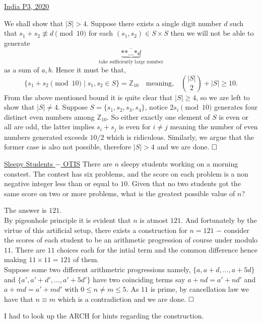 \begin{problem}{1}{\href{https://artofproblemsolving.com/community/c6h1989008p34732913}{India P3, 2020}}
\begin{solution}
	 We shall show that $|S|>4$. Suppose there exists a single digit number $d$ such that $s_1+s_2\not\equiv d\pmod{10}$ for each $(s_1, s_2)\in S\times S$ then we will not be able to generate
$$\underbrace{\overline{\text{**}\ldots\text{*}d}}_{\text{take sufficiently large number}}$$as a sum of $a,b$. Hence it must be that,
$$\{s_1+s_2\pmod{10} \mid s_1,s_2\in S\}=\mathbb{Z}_{10}\quad\text{meaning,}\quad \binom{|S|}{2}+|S|\ge 10.$$From the above mentioned bound it is quite clear that $|S|\ge 4$, so we are left to show that $|S|\ne 4$. Suppose $S=\{s_1,s_2,s_3,s_4\}$, notice $2s_i\pmod {10}$ generates four distinct even numbers among $\mathbb{Z}_{10}$. So either exactly one element of $S$ is even or all are odd, the latter implies $s_i+s_j$ is even for $i\ne j$ meaning the number of even numbers generated exceeds $10/2$ which is ridiculous. Similarly, we argue that the former case is also not possible, therefore $|S|>4$ and we are done. $\qedwhite$

	\end{solution}
\end{problem}


\begin{problem}{2}{\href{https://otis.evanchen.cc/arch/SASHAOPT/}{Sleepy Students $-$ OTIS}}
	There are $n$ sleepy students working on a morning constest. The contest  has six problems, and the score on each problem is a non negative integer less than or equal to $10$. Given that no two students got the same score on two or more problems, what is the greatest possible value of $n$?
	\begin{solution} The answer is $121$.\\
	\indent By pigeonhole principle it is evident that $n$ is atmost $121$. And fortunately by the virtue of this artificial setup, there exists a construction for $n=121$ $-$ consider the scores of each student to be an arithmetic progression of course under modulo $11$. There are $11$ choices each for the intial term and the common difference hence making $11\times 11=121$ of them.\\
	
	 Suppose some two different arithmetric progressions namely, $\{a, a+d, \ldots, a+5d\}$ and $\{a', a'+d', \ldots, a'+5d'\}$ have two coinciding terms say $a+nd=a'+nd'$ and $a+md=a'+md'$ with $0\le n\ne m\le 5$. As $11$ is prime, by cancellation law we have that $n\equiv m$ which is a contradiction and we are done. $\qedwhite$\\

	\begin{remark}[title=Confession.$\hspace{1mm}$] 
	I had to look up the ARCH for hints regarding the construction.
	\end{remark}
	\end{solution}
\end{problem}


